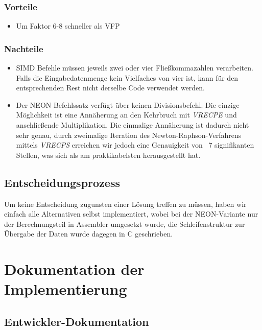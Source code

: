 \documentclass[11pt]{scrartcl}
\begin{document}
\subsubsection{Vorteile}
\begin{itemize}
\item Um Faktor 6-8 schneller als VFP
\end{itemize}
\subsubsection{Nachteile}
\begin{itemize}
\item SIMD Befehle müssen jeweils zwei oder vier Fließkommazahlen verarbeiten. Falls die Eingabedatenmenge kein Vielfaches von vier ist, kann für den entsprechenden Rest nicht derselbe Code verwendet werden.
\item Der NEON Befehlssatz verfügt über keinen Divisionsbefehl. Die einzige Möglichkeit ist eine Annäherung an den Kehrbruch mit \emph{VRECPE} und anschließende Multiplikation.
Die einmalige Annäherung ist dadurch nicht sehr genau, durch zweimalige Iteration des Newton-Raphson-Verfahrens mittels \emph{VRECPS} erreichen wir jedoch eine Genauigkeit von ~7 signifikanten Stellen, was sich als am praktikabelsten herausgestellt hat. 
\end{itemize}
\subsection{Entscheidungsprozess}
Um keine Entscheidung zugunsten einer Lösung treffen zu müssen, haben wir einfach alle Alternativen selbst implementiert, wobei bei der NEON-Variante nur der Berechnungsteil in Assembler umgesetzt wurde, die Schleifenstruktur zur Übergabe der Daten wurde dagegen in C geschrieben.
\section{Dokumentation der Implementierung}
\subsection{Entwickler-Dokumentation}
\end{document}
